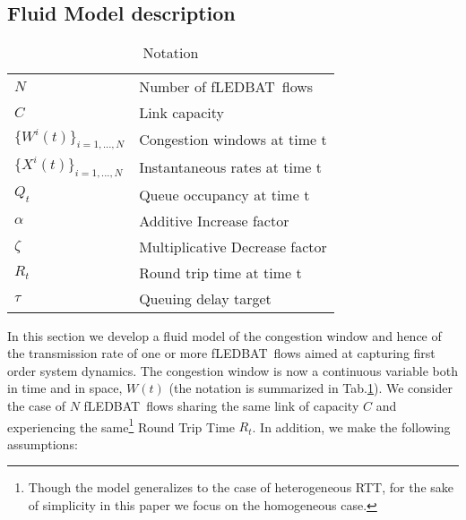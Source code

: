 \documentclass[conference]{IEEEtran}
\newcommand{\fledbat}[0]{fLEDBAT}
\begin{document}
\subsection{Fluid Model description}\label{sec:fluidmodel}
\begin{table}[!t]
   \begin{footnotesize}
   \begin{center}
      \caption{Notation}\label{tab:notation}
      \begin{tabular}{|l|l|}
         \hline
          $N$                      & Number of \fledbat\ flows \\
          $C$                      & Link capacity \\
          $\{W^i(t)\}_{i=1,...,N}$ & Congestion windows at time t \\
          $\{X^i(t)\}_{i=1,...,N}$ & Instantaneous rates at time t \\
          $Q_t$                    & Queue occupancy at time t \\
          $\alpha$                 & Additive Increase factor \\
          $\zeta$                  & Multiplicative Decrease factor \\
          $R_t$                    & Round trip time at time t \\
          $\tau$                   & Queuing delay target \\
         \hline
      \end{tabular}
   \end{center}
   \end{footnotesize}
\end{table}
In this section we develop a fluid model of the congestion window and hence of the transmission rate of one or more \fledbat\ flows aimed at capturing first order system dynamics.
The congestion window is now a continuous variable both in time and in space, $W(t)$  (the notation is summarized in Tab.\ref{tab:notation}).
We consider the case of $N$ \fledbat\ flows sharing the same link of capacity $C$ and experiencing the same\footnote{Though the model generalizes to the case of heterogeneous RTT, for the sake of simplicity in this paper we focus on the homogeneous case.} Round Trip Time $R_t$.
In addition, we make the following assumptions:
\end{document}
